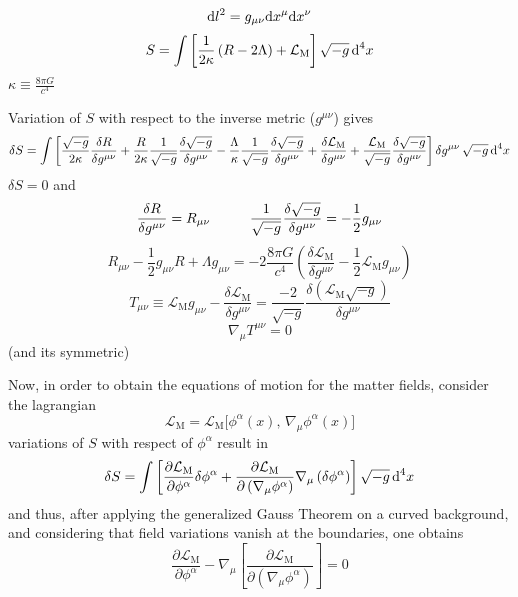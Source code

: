\begin{equation}
	\text{d} l^2=g_{\mu\nu}\text{d} x^\mu\text{d} x^\nu
\end{equation}
\begin{equation}
	S=\int\left[\frac{1}{2\kappa}\left(R-2\Lambda\right)+\mathcal{L}_{\text{M}}\right]\sqrt{-g}\,\text{d}^4 x
\end{equation}
$\kappa\equiv\frac{8\pi G}{c^4}$

Variation of $S$ with respect to the inverse metric ($g^{\mu\nu}$) gives
\begin{multline}
	\delta S=\int \left[\frac{\sqrt{-g}}{2\kappa}\frac{\delta R}{\delta g^{\mu\nu}}+\frac{R}{2\kappa}\frac{1}{\sqrt{-g}}\frac{\delta \sqrt{-g}}{\delta g^{\mu\nu}}-\frac{\Lambda}{\kappa}\frac{1}{\sqrt{-g}}\frac{\delta\sqrt{-g}}{\delta g^{\mu\nu}}+\frac{\delta\mathcal{L}_{\text{M}}}{\delta g^{\mu\nu}}+\frac{\mathcal{L}_{\text{M}}}{\sqrt{-g}}\frac{\delta\sqrt{-g}}{\delta g^{\mu\nu}}\right]\delta g^{\mu\nu}\,\sqrt{-g}\,\text{d}^4x
\end{multline}
$\delta S=0$ and
\begin{equation}
	\frac{\delta R}{\delta g^{\mu\nu}}=R_{\mu\nu}\hspace{1.0cm}\frac{1}{\sqrt{-g}}\frac{\delta\sqrt{-g}}{\delta g^{\mu\nu}}=-\frac{1}{2}g_{\mu\nu}
\end{equation}
\begin{equation}
	R_{\mu\nu}-\frac{1}{2}g_{\mu\nu}R+\Lambda g_{\mu\nu}=-2\frac{8\pi G}{c^4}\left(\frac{\delta\mathcal{L}_{\text{M}}}{\delta g^{\mu\nu}}-\frac{1}{2}\mathcal{L}_{\text{M}}g_{\mu\nu}\right)
\end{equation}
\begin{equation}
	T_{\mu\nu}\equiv \mathcal{L}_{\text{M}}g_{\mu\nu}-\frac{\delta\mathcal{L}_{\text{M}}}{\delta g^{\mu\nu}}=\frac{-2}{\sqrt{-g}}\frac{\delta \left(\mathcal{L}_{\text{M}}\sqrt{-g}\right)}{\delta g^{\mu\nu}}
\end{equation}
\cite{Energy-MomentumTensor}
\begin{equation}
	\nabla_\mu T^{\mu\nu}=0
\end{equation}
(and its symmetric)

Now, in order to obtain the equations of motion for the matter fields, consider the lagrangian
\begin{equation}
	\mathcal{L}_{\text{M}}=\mathcal{L}_{\text{M}}\big[\phi^\alpha(x),\,\nabla_\mu\phi^\alpha(x)\big]
\end{equation}
variations of $S$ with respect of $\phi^\alpha$ result in
\begin{equation}
	\delta S=\int\left[\frac{\partial \mathcal{L}_\text{M}}{\partial \phi^\alpha}\delta\phi^\alpha+\frac{\partial \mathcal{L}_\text{M}}{\partial\left(\nabla_\mu\phi^\alpha\right)}\nabla_\mu\left(\delta\phi^\alpha\right)\right]\sqrt{-g}\,\text{d}^4x
\end{equation}
and thus, after applying the generalized Gauss Theorem on a curved background, and considering that field variations vanish at the boundaries, one obtains
\begin{equation}
	\frac{\partial \mathcal{L}_\text{M}}{\partial \phi^\alpha}-\nabla_\mu\left[\frac{\partial \mathcal{L}_\text{M}}{\partial\left(\nabla_\mu\phi^\alpha\right)}\right]=0
\end{equation}
